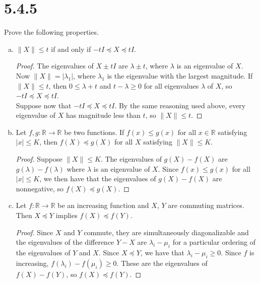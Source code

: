 \documentclass[11pt,letterpaper]{report}
\newcommand{\reals}{\mathbb{R}}
\begin{document}
\section*{5.4.5}
Prove the following properties.
\begin{enumerate}[(a)]
	\item $\|X\|\leq t$ if and only if $-tI\preceq X \preceq tI$.
	\begin{proof}
		The eigenvalues of $X\pm tI$ are $\lambda \pm t$, where $\lambda$ is an eigenvalue of $X$. Now $\|X\| = |\lambda_1|$, where $\lambda_1$ is the eigenvalue with the largest magnitude. If $\|X\| \leq t$, then $0\leq \lambda + t$ and $t-\lambda \geq 0$ for all eigenvalues $\lambda$ of $X$, so $-tI \preceq X\preceq tI$.\\

		\noindent Suppose now that $-tI\preceq X\preceq tI$. By the same reasoning used above, every eigenvalue of $X$ has magnitude less than $t$, so $\|X\|\leq t$.
	\end{proof}





	\item Let $f,g:\reals\to \reals$ be two functions. If $f(x)\leq g(x)$ for all $x\in \reals$ satisfying $|x|\leq K$, then $f(X)\preceq g(X)$ for all $X$ satisfying $\|X\|\leq K$.
	\begin{proof}
		Suppose $\|X\|\leq K$. The eigenvalues of $g(X)-f(X)$ are $g(\lambda)-f(\lambda)$ where $\lambda$ is an eigenvalue of $X$. Since $f(x)\leq g(x)$ for all $|x|\leq K$, we then have that the eigenvalues of $g(X)-f(X)$ are nonnegative, so $f(X)\preceq g(X)$.
	\end{proof}





	\item Let $f:\reals\to \reals$ be an increasing function and $X$, $Y$ are commuting matrices. Then $X\preceq Y$ implies $f(X)\preceq f(Y)$.
	\begin{proof}
		Since $X$ and $Y$ commute, they are simultaneously diagonalizable and the eigenvalues of the difference $Y-X$ are $\lambda_i-\mu_i$ for a particular ordering of the eigenvalues of $Y$ and $X$. Since $X\preceq Y$, we have that $\lambda_i-\mu_i\geq 0$. Since $f$ is increasing, $f(\lambda_i)-f(\mu_i)\geq 0$. These are the eigenvalues of $f(X)-f(Y)$, so $f(X)\preceq f(Y)$. 
	\end{proof}





\end{enumerate}
\end{document}
